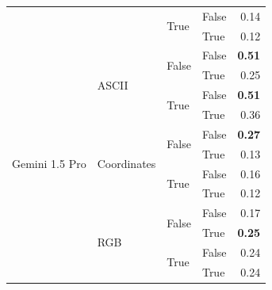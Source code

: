 \documentclass{article}
\begin{document}
\begin{table}
\begin{center}
{\begin{tabular}{@{}llllr@{}}
                                                &                                   & \multirow[c]{2}{*}{True}  & False                     & 0.14 \\
                                                &                                   &                           & True                      & 0.12 \\
    \midrule
    \multirow[c]{13}{*}{Gemini 1.5 Pro}         & \multirow[c]{4}{*}{ASCII}         & \multirow[c]{2}{*}{False} & False                     & \textbf{0.51} \\
                                                &                                   &                           & True                      & 0.25 \\
                                                &                                   & \multirow[c]{2}{*}{True}  & False                     & \textbf{0.51} \\
                                                &                                   &                           & True                      & 0.36 \\
    \cmidrule{2-5}
                                                & \multirow[c]{4}{*}{Coordinates}   & \multirow[c]{2}{*}{False} & False                     & \textbf{0.27} \\
                                                &                                   &                           & True                      & 0.13 \\
                                                &                                   & \multirow[c]{2}{*}{True}  & False                     & 0.16 \\
                                                &                                   &                           & True                      & 0.12 \\
    \cmidrule{2-5}
                                                & \multirow[c]{4}{*}{RGB}           & \multirow[c]{2}{*}{False} & False                     & 0.17 \\
                                                &                                   &                           & True                      & \textbf{0.25} \\
                                                &                                   & \multirow[c]{2}{*}{True}  & False                     & 0.24 \\
                                                &                                   &                           & True                      & 0.24 \\

\end{tabular}}
\end{center}
\end{table}
\end{document}
